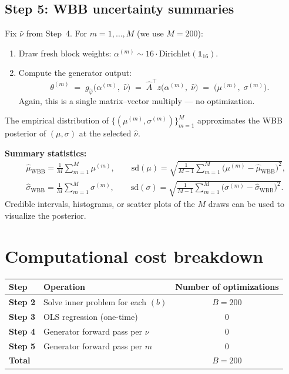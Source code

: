\documentclass[12pt]{article}
\begin{document}
\subsection{Step 5: WBB uncertainty summaries}

Fix $\hat\nu$ from Step~4.  For $m = 1,\ldots,M$ (we use $M=200$):
\begin{enumerate}
\item Draw fresh block weights: $\alpha^{(m)} \sim 16 \cdot \mathrm{Dirichlet}(\mathbf{1}_{16})$.
\item Compute the generator output:
\[
\theta^{(m)} \;=\; g_{\hat\varphi}\!\bigl(\alpha^{(m)},\;\hat\nu\bigr) \;=\; \hat A^\top z\bigl(\alpha^{(m)},\;\hat\nu\bigr) \;=\; \bigl(\mu^{(m)},\;\sigma^{(m)}\bigr).
\]
Again, this is a single matrix--vector multiply --- no optimization.
\end{enumerate}

The empirical distribution of $\bigl\{(\mu^{(m)},\sigma^{(m)})\bigr\}_{m=1}^M$ approximates the WBB posterior of $(\mu,\sigma)$ at the selected $\hat\nu$.

\textbf{Summary statistics:}
\begin{align*}
&\hat\mu_{\mathrm{WBB}} = \frac{1}{M}\sum_{m=1}^M \mu^{(m)}, \qquad \mathrm{sd}(\mu) = \sqrt{\frac{1}{M-1}\sum_{m=1}^M \bigl(\mu^{(m)}-\hat\mu_{\mathrm{WBB}}\bigr)^2},\\
&\hat\sigma_{\mathrm{WBB}} = \frac{1}{M}\sum_{m=1}^M \sigma^{(m)}, \qquad \mathrm{sd}(\sigma) = \sqrt{\frac{1}{M-1}\sum_{m=1}^M \bigl(\sigma^{(m)}-\hat\sigma_{\mathrm{WBB}}\bigr)^2}.
\end{align*}
Credible intervals, histograms, or scatter plots of the $M$ draws can be used to visualize the posterior.

\section{Computational cost breakdown}

\begin{center}
\begin{tabular}{llc}
\hline
Step & Operation & Number of optimizations \\
\hline
\textbf{Step 2} & Solve inner problem for each $(b)$ & $B = 200$ \\
\textbf{Step 3} & OLS regression (one-time) & 0 \\
\textbf{Step 4} & Generator forward pass per $\nu$ & 0 \\
\textbf{Step 5} & Generator forward pass per $m$ & 0 \\
\hline
\textbf{Total} & & $B = 200$ \\
\hline
\end{tabular}
\end{center}
\end{document}
